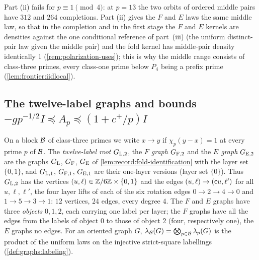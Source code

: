 \begin{remark}\label{rem:middle-class-three}
Part (ii) fails for $p\equiv1\pmod4$: at $p=13$ the two orbits of ordered
middle pairs have $312$ and $264$ completions. Part (ii) gives the $F$ and
$E$ laws the same middle law, so that in the completion and in the first
stage the $F$ and $E$ kernels are densities against the one conditional
reference of part~(iii) (the uniform distinct-pair law given the middle
pair) and the fold kernel has middle-pair density identically $1$
(\cref{rem:polarization-uses}); this is why the middle range consists of
class-three primes, every class-one prime below $P_4$ being a prefix prime
(\cref{lem:frontier:iidlocal}).
\end{remark}

\subsection{The twelve-label graphs and bounds \texorpdfstring{$-gp^{-1/2}I\preceq A_p\preceq(1+c^+/p)I$}{-g p\textasciicircum (-1/2) I <= A\_p <= (1+c+/p) I}}
\label{subsec:push:layer12spectral}

On a block $\mathcal B$ of class-three primes we write $x\to y$ if $\chi_p(y-x)=1$
at every prime $p$ of $\mathcal B$. The \emph{twelve-label root} $G_{\rm L,2}$, the
\emph{$F$ graph} $G_{\rm F,2}$ and the \emph{$E$ graph} $G_{\rm E,2}$ are the
graphs $G_{\rm L}$, $G_{\rm F}$, $G_{\rm E}$ of
\cref{lem:record:fold-identification} with the layer set $\{0,1\}$, and
$G_{\rm L,1}$, $G_{\rm F,1}$, $G_{\rm E,1}$ are their one-layer versions (layer
set $\{0\}$). Thus $G_{\rm L,2}$ has the vertices
$(u,\ell)\in\mathbb Z/6\mathbb Z\times\{0,1\}$ and the edges $(u,\ell)\to(\mathsf c u,\ell')$ for
all $u,\ell,\ell'$, the four layer lifts of each of the six rotation edges
$0\to2\to4\to0$ and $1\to5\to3\to1$: $12$ vertices, $24$ edges, every degree
$4$. The $F$ and $E$ graphs have three \emph{objects} $0,1,2$, each carrying
one label per layer; the $F$ graphs have all the edges from the labels of
object $0$ to those of object $2$ (four, respectively one), the $E$ graphs no
edges. For an oriented graph $G$,
$\lambda_{\mathcal B}(G)=\bigotimes_{p\in\mathcal B}\lambda_p(G)$ is the product of the
uniform laws on the injective strict-square labellings
(\cref{def:graphs:labeling}).

